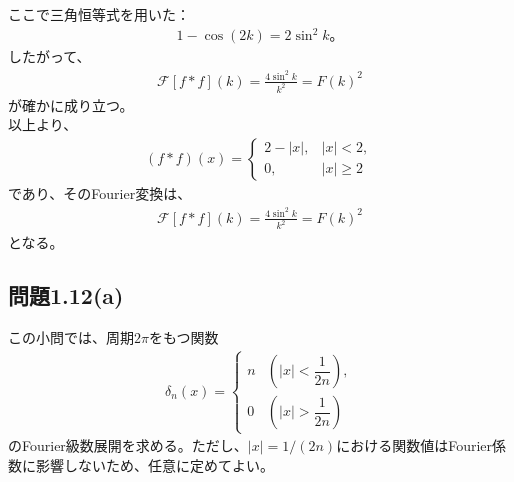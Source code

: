 \documentclass[platex,dvipdfmx,a4paper]{jsarticle}
\begin{document}
  ここで三角恒等式を用いた：
  \begin{align*}
    1-\cos(2k)
    =
    2\sin^2 k。
  \end{align*}
  したがって、
  \begin{align*}
    \mathcal{F}[f*f](k)
    =
    \frac{4\sin^2 k}{k^2}
    =
    F(k)^2
  \end{align*}
  が確かに成り立つ。\\
  以上より、
  \begin{align*}
    (f*f)(x)
    =
    \begin{cases}
      2-|x|,& |x|<2,\\
      0,& |x|\ge 2
    \end{cases}
  \end{align*}
  であり、そのFourier変換は、
  \begin{align*}
    \mathcal{F}[f*f](k)
    =
    \frac{4\sin^2 k}{k^2}
    =
    F(k)^2
  \end{align*}
  となる。

  \subsection*{問題1.12(a)}

  この小問では、周期$2\pi$をもつ関数
  \begin{align*}
    \delta_n(x)
    =
    \begin{cases}
      n & \left(|x|<\dfrac{1}{2n}\right),\\
      0 & \left(|x|>\dfrac{1}{2n}\right)
    \end{cases}
  \end{align*}
  のFourier級数展開を求める。ただし、$|x|=1/(2n)$における関数値はFourier係数に影響しないため、任意に定めてよい。
  
\end{document}

